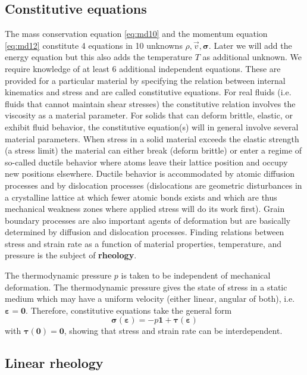\subsection{Constitutive equations}

The mass conservation equation \eqref{eq:md10} and the momentum equation \eqref{eq:md12} constitute 4
equations in 10 unknowns $\rho,\vec{v},{\bm \sigma}$. 
Later we will add the energy equation but this also
adds the temperature $T$ as additional unknown. We require knowledge of at least 6
additional independent equations. These are provided for a particular material by
specifying the relation between internal kinematics and stress and are called constitutive
equations. For real fluids (i.e. fluids that cannot maintain shear stresses) the constitutive
relation involves the viscosity as a material parameter. For solids that can deform brittle,
elastic, or exhibit fluid behavior, the constitutive equation(s) will in general involve
several material parameters. When stress in a solid material exceeds the elastic strength (a
stress limit) the material can either break (deform brittle) or enter a regime of so-called
ductile behavior where atoms leave their lattice position and occupy new positions
elsewhere. Ductile behavior is accommodated by atomic diffusion processes and by
dislocation processes (dislocations are geometric disturbances in a crystalline lattice at
which fewer atomic bonds exists and which are thus mechanical weakness zones where
applied stress will do its work first). Grain boundary processes are also important agents
of deformation but are basically determined by diffusion and dislocation processes.
Finding relations between stress and strain rate as a function of material properties,
temperature, and pressure is the subject of {\bf rheology}.

The thermodynamic pressure $p$ is taken to be independent of mechanical deformation.
The thermodynamic pressure gives the state of stress in a static medium which may have
a uniform velocity (either linear, angular of both), i.e. ${\bm\varepsilon}={\bm 0}$. 
Therefore, constitutive equations take the general form
\begin{equation}
{\bm \sigma}({\bm\varepsilon}) = -p {\bm 1} + {\bm \tau}({\bm\varepsilon})
\label{eq:md18}
\end{equation}
with ${\bm \tau}({\bm 0})={\bm 0}$, showing that stress and strain rate can be interdependent.

\subsection{Linear rheology}

